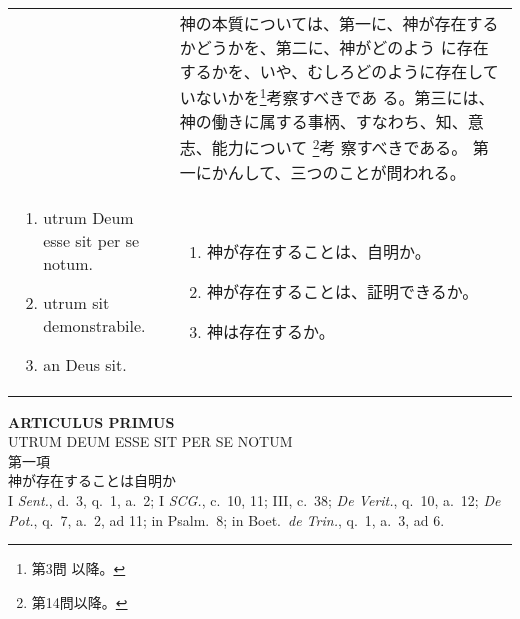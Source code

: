 \documentclass[10pt]{jsarticle} %
\begin{document}
\begin{longtable}{p{21em}p{21em}}
&

神の本質については、第一に、神が存在するかどうかを、第二に、神がどのよう
 に存在するかを、いや、むしろどのように存在していないかを\footnote{第3問
 以降。}考察すべきであ
 る。第三には、神の働きに属する事柄、すなわち、知、意志、能力について
 \footnote{第14問以降。}考
 察すべきである。
第一にかんして、三つのことが問われる。

\\

\begin{enumerate}
 \item utrum Deum esse sit per se notum. 
 \item utrum sit demonstrabile. 
 \item an Deus sit.
\end{enumerate}

&

\begin{enumerate}
 \item 神が存在することは、自明か。
 \item 神が存在することは、証明できるか。 
 \item 神は存在するか。
\end{enumerate}


\\
\end{longtable}



\newpage
{}

\begin{center}
 {\Large {\bf ARTICULUS PRIMUS}}\\
 {\large UTRUM  DEUM ESSE SIT PER SE NOTUM}\\
 {\Large 第一項\\神が存在することは自明か}\\
 {\footnotesize I {\it Sent.}, d.~3, q.~1, a.~2; I {\it SCG.}, c.~10, 11;
 III, c.~38; {\it De Verit.}, q.~10, a.~12; {\it De Pot.}, q.~7, a.~2,
 ad 11; in Psalm.~8; in Boet.~{\it de Trin.}, q.~1, a.~3, ad 6.}

\end{center}
\end{document}
